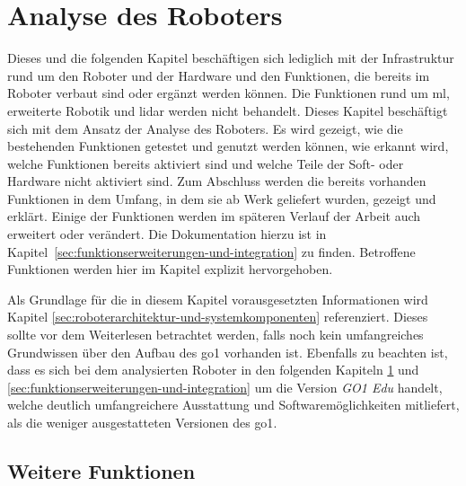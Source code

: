 \section{Analyse des Roboters}
\label{sec:analyse-des-roboters}

Dieses und die folgenden Kapitel beschäftigen sich lediglich mit der Infrastruktur rund um den Roboter
und der Hardware und den Funktionen, die bereits im Roboter verbaut sind oder ergänzt werden können.
Die Funktionen rund um \gls{ml}, erweiterte Robotik und \gls{lidar} werden nicht behandelt.
Dieses Kapitel beschäftigt sich mit dem Ansatz der Analyse des Roboters.
Es wird gezeigt, wie die bestehenden Funktionen getestet und genutzt werden können, wie erkannt wird,
welche Funktionen bereits aktiviert sind und welche Teile der Soft- oder Hardware nicht aktiviert sind.
Zum Abschluss werden die bereits vorhanden Funktionen in dem Umfang, in dem sie ab Werk geliefert wurden,
gezeigt und erklärt.
Einige der Funktionen werden im späteren Verlauf der Arbeit auch erweitert oder verändert.
Die Dokumentation hierzu ist in Kapitel~\ref{sec:funktionserweiterungen-und-integration} zu finden.
Betroffene Funktionen werden hier im Kapitel explizit hervorgehoben.

Als Grundlage für die in diesem Kapitel vorausgesetzten Informationen wird Kapitel \ref{sec:roboterarchitektur-und-systemkomponenten}
referenziert.
Dieses sollte vor dem Weiterlesen betrachtet werden, falls noch kein umfangreiches Grundwissen über den Aufbau des \gls{go1}
vorhanden ist.
Ebenfalls zu beachten ist, dass es sich bei dem analysierten Roboter in den folgenden Kapiteln \ref{sec:analyse-des-roboters}
und \ref{sec:funktionserweiterungen-und-integration} um die Version \emph{GO1 Edu} handelt, welche deutlich umfangreichere
Ausstattung und Softwaremöglichkeiten mitliefert, als die weniger ausgestatteten Versionen des \gls{go1}.












\subsection{Weitere Funktionen}
\label{subsec:weitere-funktionen}

